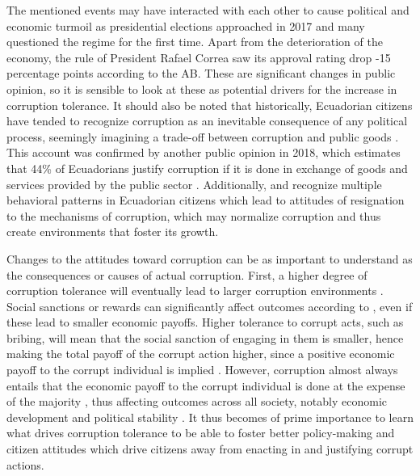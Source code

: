 \documentclass[12pt,a4]{article}\usepackage[]{graphicx}\usepackage[]{xcolor}
\begin{document}
The mentioned events may have interacted with each other to cause political and economic turmoil as presidential elections approached in 2017 and many questioned the regime for the first time. Apart from the deterioration of the economy, the rule of President Rafael Correa saw its approval rating drop -15 percentage points according to the AB. These are significant changes in public opinion, so it is sensible to look at these as potential drivers for the increase in corruption tolerance. It should also be noted that historically, Ecuadorian citizens have tended to recognize corruption as an inevitable consequence of any political process, seemingly imagining a trade-off between corruption and public goods \parencite{Adoum.2000}. This account was confirmed by another public opinion in 2018, which estimates that 44\% of Ecuadorians justify corruption if it is done in exchange of goods and services provided by the public sector \parencite{Loaiza.2019}. Additionally, \textcite{Hurtado.2007} and \textcite{Adoum.2000} recognize multiple behavioral patterns in Ecuadorian citizens which lead to attitudes of resignation to the mechanisms of corruption, which may normalize corruption and thus create environments that foster its growth. 

Changes to the attitudes toward corruption can be as important to understand as the consequences or causes of actual corruption. First, a higher degree of corruption tolerance will eventually lead to larger corruption environments \parencite{Campbell.2014}. Social sanctions or rewards can significantly affect outcomes according to \textcite{Akerlof.1980}, even if these lead to smaller economic payoffs. Higher tolerance to corrupt acts, such as bribing, will mean that the social sanction of engaging in them is smaller, hence making the total payoff of the corrupt action higher, since a positive economic payoff to the corrupt individual is implied \parencite{Shleifer.1993}. However, corruption almost always entails that the economic payoff to the corrupt individual is done at the expense of the majority \parencite{Warren.2004}, thus affecting outcomes across all society, notably economic development and political stability \parencite{Singer.2016}. It thus becomes of prime importance to learn what drives corruption tolerance to be able to foster better policy-making and citizen attitudes which drive citizens away from enacting in and justifying corrupt actions.




\end{document}
